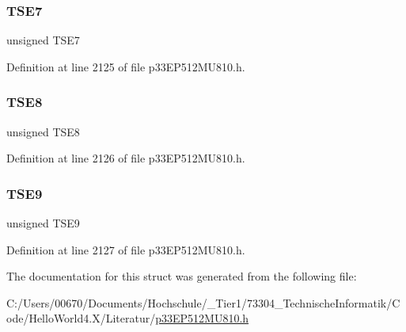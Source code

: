 \subsubsection{\texorpdfstring{T\+S\+E7}{TSE7}}
{\footnotesize\ttfamily unsigned T\+S\+E7}



Definition at line 2125 of file p33\+E\+P512\+M\+U810.\+h.

\mbox{\label{structtag_t_s_c_o_n_b_i_t_s_ac8f4d3f7b0b11c209cf23725dd6111d7}} 
\subsubsection{\texorpdfstring{T\+S\+E8}{TSE8}}
{\footnotesize\ttfamily unsigned T\+S\+E8}



Definition at line 2126 of file p33\+E\+P512\+M\+U810.\+h.

\mbox{\label{structtag_t_s_c_o_n_b_i_t_s_a571bf0b8762c4c1805f16c0ddf743dc8}} 
\subsubsection{\texorpdfstring{T\+S\+E9}{TSE9}}
{\footnotesize\ttfamily unsigned T\+S\+E9}



Definition at line 2127 of file p33\+E\+P512\+M\+U810.\+h.



The documentation for this struct was generated from the following file\+:\begin{DoxyCompactItemize}
\item 
C\+:/\+Users/00670/\+Documents/\+Hochschule/\+\_\+\+Tier1/73304\+\_\+\+Technische\+Informatik/\+Code/\+Hello\+World4.\+X/\+Literatur/\hyperlink{p33_e_p512_m_u810_8h}{p33\+E\+P512\+M\+U810.\+h}\end{DoxyCompactItemize}
